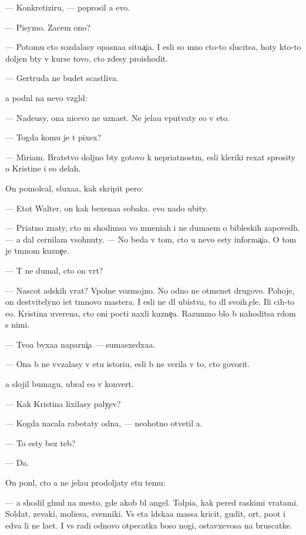 \documentclass[10pt]{book}
\begin{document}
— Konkretiziru{\y}, — poprosil {\y}a {\y}evo.

— Pisymo. Zacem ono?

— Potomu cto sozdalasy opasna{\y}a situa{\c}i{\y}a. I {\y}esli so mno{\y} cto-to slucitsa, hoty kto-to doljen b{\yi}ty v kurse tovo, cto zdesy proishodit.

— Gertruda ne budet scastliva.

{\Y}a podn{\ia}l na nevo vzgl{\ia}d:

— Nade{\y}usy, ona nicevo ne uzna{\y}et. Ne jela{\y}u vput{\yi}vaty {\y}e{\y}o v eto.

— Togda komu je t{\yi} pixex?

— Mi\-ri\-am. Bratstvo doljno b{\yi}ty gotovo k nepri{\y}atnost{\ia}m, {\y}esli kleriki rexat sprosity o Kristine i {\y}e{\y}o delah.

On pomolcal, sluxa{\y}a, kak skripit pero:

— Etot Walter, on kak bexena{\y}a sobaka. {\Y}evo nado ubity.

— Pri{\y}atno znaty, cto m{\yi} shodimsa vo mneni{\y}ah i ne duma{\y}em o bible{\y}skih zapoved{\ia}h. — {\Y}a dal cernilam v{\yi}sohnuty. — No beda v tom, cto u nevo {\y}esty informa{\c}i{\y}a. O tom je t{\e}mnom kuzne{\c}e.

— T{\yi} ne dumal, cto on vr{\e}t?

— Nascot adskih vrat? Vpolne vozmojno. No odno ne otmen{\ia}{\y}et drugovo. Pohoje, on de{\y}stvitelyno i{\x}et t{\e}mnovo mastera. I {\y}esli ne dl{\ia} ubi{\y}stva, to dl{\ia} svo{\y}ih {\c}ele{\y}. Ili c{\y}ih-to {\y}e{\x}o. Kristina uverena, cto oni pocti naxli kuzne{\c}a. Razumno b{\yi}lo b{\yi} nahoditsa r{\ia}dom s nimi.

— Tvo{\y}a b{\yi}vxa{\y}a naparni{\c}a — sumasxedxa{\y}a.

— Ona b{\yi} ne vv{\ia}zalasy v etu istori{\y}u, {\y}esli b{\yi} ne verila v to, cto govorit.

{\Y}a slojil bumagu, ubral {\y}e{\y}o v konvert.

— Kak Kristina lixilasy paly{\c}ev?

— Kogda nacala rabotaty odna, — neohotno otvetil {\y}a.

— To {\y}esty bez teb{\ia}?

— Da.

On pon{\ia}l, cto {\y}a ne jela{\y}u prodoljaty etu temu:

— {\Y}a shodil gl{\ia}nul na mesto, gde {\y}akob{\yi} b{\yi}l angel. Tolpi{\x}a, kak pered ra{\y}skimi vratami. Soldat{\yi}, zevaki, mol{\ia}{\x}i{\y}esa, sv{\ia}{\x}enniki. Vs{\ia} eta l{\io}dska{\y}a massa kricit, gudit, or{\e}t, po{\y}ot i {\y}edva li ne la{\y}et. I vs{\e} radi odnovo otpecatka boso{\y} nogi, ostav\-xe\-vosa na bruscatke.
\end{document}
